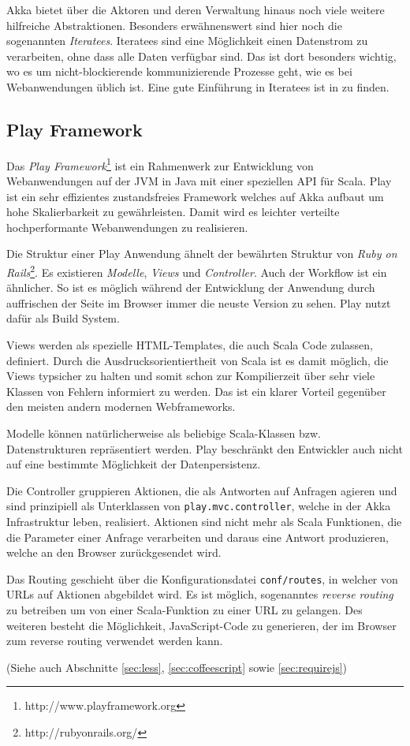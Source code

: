 Akka bietet über die Aktoren und deren Verwaltung hinaus noch viele weitere hilfreiche
Abstraktionen. Besonders erwähnenswert sind hier noch die sogenannten \textit{Iteratees}. Iteratees
sind eine Möglichkeit einen Datenstrom zu verarbeiten, ohne dass alle Daten verfügbar sind. Das ist
dort besonders wichtig, wo es um nicht-blockierende kommunizierende Prozesse geht, wie es bei
Webanwendungen üblich ist. Eine gute Einführung in Iteratees ist in \cite{iteratees} zu finden.

\subsection{Play Framework}

Das \textit{Play Framework}\footnote{http://www.playframework.org} ist ein Rahmenwerk zur
Entwicklung von Webanwendungen auf der JVM in Java mit einer speziellen API für Scala. Play ist ein
sehr effizientes zustandsfreies Framework welches auf Akka aufbaut um hohe Skalierbarkeit zu
gewährleisten. Damit wird es leichter verteilte hochperformante Webanwendungen zu realisieren.

Die Struktur einer Play Anwendung ähnelt der bewährten Struktur von \textit{Ruby on
Rails}\footnote{http://rubyonrails.org/}. Es existieren \textit{Modelle}, \textit{Views} und
\textit{Controller}. Auch der Workflow ist ein ähnlicher. So ist es möglich während der
Entwicklung der Anwendung durch auffrischen der Seite im Browser immer die neuste Version zu sehen.
Play nutzt dafür  als Build System.

Views werden als spezielle HTML-Templates, die auch Scala Code zulassen, definiert. Durch die
Ausdrucksorientiertheit von Scala ist es damit möglich, die Views typsicher zu halten und somit schon
zur Kompilierzeit über sehr viele Klassen von Fehlern informiert zu werden. Das ist ein klarer
Vorteil gegenüber den meisten andern modernen Webframeworks.

Modelle können natürlicherweise als beliebige Scala-Klassen bzw. Datenstrukturen repräsentiert
werden. Play beschränkt den Entwickler auch nicht auf eine bestimmte Möglichkeit der
Datenpersistenz.

Die Controller gruppieren Aktionen, die als Antworten auf Anfragen agieren und sind prinzipiell
als Unterklassen von \texttt{play.mvc.controller}, welche in der Akka Infrastruktur leben,
realisiert. Aktionen sind nicht mehr als Scala Funktionen, die die Parameter einer Anfrage
verarbeiten und daraus eine Antwort produzieren, welche an den Browser zurückgesendet wird.

Das Routing geschieht über die Konfigurationsdatei \texttt{conf/routes}, in welcher von URLs auf
Aktionen abgebildet wird. Es ist möglich, sogenanntes \textit{reverse routing} zu betreiben um von
einer Scala-Funktion zu einer URL zu gelangen. Des weiteren besteht die Möglichkeit, JavaScript-Code 
zu generieren, der im Browser zum reverse routing verwendet werden kann.

(Siehe auch Abschnitte \ref{sec:less}, \ref{sec:coffeescript} sowie \ref{sec:requirejs})

\label{sec:play}